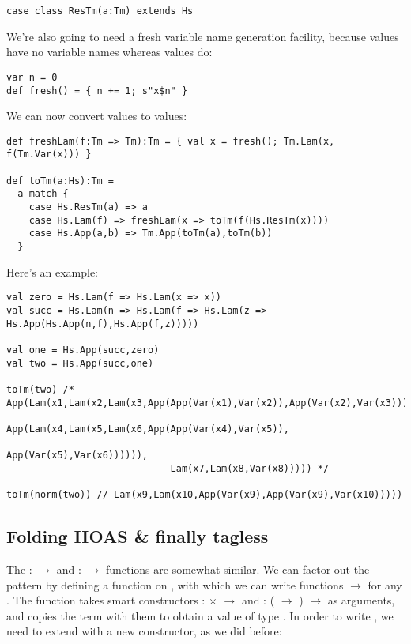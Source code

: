 \begin{lstlisting}
case class ResTm(a:Tm) extends Hs
\end{lstlisting}

We're also going to need a fresh variable name generation facility, because  values have no variable names whereas  values do:

\begin{lstlisting}
var n = 0
def fresh() = { n += 1; s"x$n" }
\end{lstlisting}

We can now convert  values to  values:

\begin{lstlisting}
def freshLam(f:Tm => Tm):Tm = { val x = fresh(); Tm.Lam(x, f(Tm.Var(x))) }

def toTm(a:Hs):Tm =
  a match {
    case Hs.ResTm(a) => a
    case Hs.Lam(f) => freshLam(x => toTm(f(Hs.ResTm(x))))
    case Hs.App(a,b) => Tm.App(toTm(a),toTm(b))
  }
\end{lstlisting}

Here's an example:

\begin{lstlisting}
val zero = Hs.Lam(f => Hs.Lam(x => x))
val succ = Hs.Lam(n => Hs.Lam(f => Hs.Lam(z => Hs.App(Hs.App(n,f),Hs.App(f,z)))))

val one = Hs.App(succ,zero)
val two = Hs.App(succ,one)

toTm(two) /* App(Lam(x1,Lam(x2,Lam(x3,App(App(Var(x1),Var(x2)),App(Var(x2),Var(x3)))))),
                       App(Lam(x4,Lam(x5,Lam(x6,App(App(Var(x4),Var(x5)),
                                                         App(Var(x5),Var(x6)))))),
                             Lam(x7,Lam(x8,Var(x8))))) */

toTm(norm(two)) // Lam(x9,Lam(x10,App(Var(x9),App(Var(x9),Var(x10)))))
\end{lstlisting}

\subsection{Folding HOAS \& finally tagless}

The  :  $\to$  and  :  $\to$  functions are somewhat similar.
We can factor out the pattern by defining a  function on , with which we can write functions  $\to$  for any .
The  function takes smart constructors  :  $\times$  $\to$  and  : ( $\to$ ) $\to$  as arguments, and copies the  term with them to obtain a value of type .
In order to write , we need to extend  with a new constructor, as we did before:

